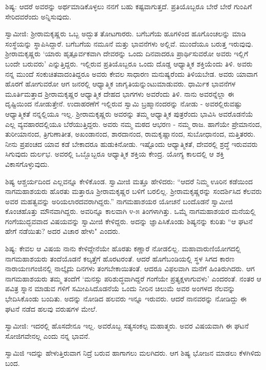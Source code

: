 ಶಿಷ್ಯ: ಆದರೆ ಅವರನ್ನು ಅರ್ಥಮಾಡಿಕೊಳ್ಳಲು ನನಗೆ ಬಹು ಕಷ್ಟವಾಗುತ್ತದೆ. ಪ್ರತಿಯೊಬ್ಬರೂ ಬೇರೆ ಬೇರೆ ಗುಂಪಿಗೆ ಸೇರಿದವರೆಂದು ಅನ್ನಿಸುವುದು.

ಸ್ವಾಮೀಜಿ: ಶ‍್ರೀರಾಮಕೃಷ್ಣರು ಒಬ್ಬ ಅದ್ಭುತ ತೋಟಗಾರರು. ಬಗೆಬಗೆಯ ಹೂಗಳಿಂದ ಹೂಗೊಂಚಲನ್ನು ಮಾಡಿ ಸಂಸ್ಥೆಯನ್ನು ಸ್ಥಾಪಿಸಿದ್ದಾರೆ. ಬಗೆಬಗೆಯ ನಮೂನೆ ಮತ್ತು ಭಾವನೆಗಳು ಅಲ್ಲಿವೆ. ಮುಂದೆಯೂ ಬರುತ್ತ ಇರುವುವು. ಶ‍್ರೀರಾಮಕೃಷ್ಣರು ‘ಯಾರು ಹೃತ್ಪೂರ್ವಕವಾಗಿ ದೇವರನ್ನು ಒಂದು ದಿನವಾದರೂ ಪ್ರಾರ್ಥಿಸುವರೋ ಅವರು ಇಲ್ಲಿಗೆ ಬಂದೇ ಬರುವರು’ ಎನ್ನುತ್ತಿದ್ದರು. ಇಲ್ಲಿರುವ ಪ್ರತಿಯೊಬ್ಬರೂ ಒಂದು ದೊಡ್ಡ ಆಧ್ಯಾತ್ಮಿಕ ಶಕ್ತಿಯೆಂದು ತಿಳಿ. ಅವರು ನನ್ನ ಮುಂದೆ ಸಂಕುಚಿತವಾದಂತಿದ್ದರೂ ಅವರು ಕೇವಲ ಸಾಧಾರಣ ಮನುಷ್ಯರೆಂದು ತಿಳಿಯಬೇಡ. ಅವರು ಯಾವಾಗ ಹೊರಗೆ ಹೋಗುವರೋ ಆಗ ಜನರಲ್ಲಿ ಆಧ್ಯಾತ್ಮಿಕ ಜಾಗೃತಿಯನ್ನುಂಟುಮಾಡುವರು. ಧಾರ್ಮಿಕ ಭಾವನೆಗಳ ಮೂರ್ತಿಮತ್ತಾದ ಶ‍್ರೀರಾಮಕೃಷ್ಣರ ಆಧ್ಯಾತ್ಮಿಕ ದೇಹದ ಭಾಗಗಳು ಅವರೆಂದು ತಿಳಿ. ನಾನು ಅವರನ್ನೆಲ್ಲಾ ಈ ದೃಷ್ಟಿಯಿಂದ ನೋಡುತ್ತೇನೆ. ಉದಾಹರಣೆಗೆ ಇಲ್ಲಿರುವ ಸ್ವಾಮಿ ಬ್ರಹ್ಮಾನಂದರನ್ನು ನೋಡು - ಅವರಲ್ಲಿರುವಷ್ಟು ಆಧ್ಯಾತ್ಮಿಕತೆ ನನ್ನಲ್ಲಿಯೂ ಇಲ್ಲ. ಶ‍್ರೀರಾಮಕೃಷ್ಣರು ಅವರನ್ನು ತಮ್ಮ ಆಧ್ಯಾತ್ಮಿಕ ಪುತ್ರರೆಂದು ಭಾವಿಸಿ ಅವರೊಡನೆಯೆ ಎಲ್ಲ ವ್ಯವಹಾರದಲ್ಲಿಯೂ ಬೆರೆಯುತ್ತಿದ್ದರು. ಅವರು ನಮ್ಮ ಮಠದ ಆಭರಣ - ನಮ್ಮ ರಾಜ. ಹಾಗೆಯೇ ಪ್ರೇಮಾನಂದ, ತುರೀಯಾನಂದ, ತ್ರಿಗುಣಾತೀತ, ಅಖಂಡಾನಂದ, ಶಾರದಾನಂದ, ರಾಮಕೃಷ್ಣಾನಂದ, ಸುಬೋಧಾನಂದ, ಮತ್ತಿತರರು. ನೀನು ಪ್ರಪಂಚದ ಯಾವ ಕಡೆ ಬೇಕಾದರೂ ಹುಡುಕಿನೋಡು. ಇಷ್ಟೊಂದು ಆಧ್ಯಾತ್ಮಿಕತೆ, ದೇವರಲ್ಲಿ ಶ್ರದ್ಧೆ ಇರುವವರು ಸಿಗುವುದು ದುರ್ಲಭ. ಅವರಲ್ಲಿ ಒಬ್ಬೊಬ್ಬರೂ ಆಧ್ಯಾತ್ಮಿಕ ಶಕ್ತಿಯ ಕೇಂದ್ರ. ಯೋಗ್ಯ ಕಾಲದಲ್ಲಿ ಆ ಶಕ್ತಿ ವಿಕಾಸಗೊಳ್ಳುವುದು.

ಶಿಷ್ಯ ಆಶ್ಚರ್ಯದಿಂದ ಎಲ್ಲವನ್ನೂ ಕೇಳಿಕೊಂಡ. ಸ್ವಾಮೀಜಿ ಮತ್ತೂ ಹೇಳಿದರು: “ಆದರೆ ನಿಮ್ಮ ಊರಿನ ಕಡೆಯಿಂದ ನಾಗಮಹಾಶಯರು ಹೊರತು ಮತ್ತಾರೂ ಶ‍್ರೀರಾಮಕೃಷ್ಣರ ಬಳಿಗೆ ಬರಲಿಲ್ಲ. ಶ‍್ರೀರಾಮಕೃಷ್ಣರನ್ನು ಸಂದರ್ಶಿಸಿದ ಕೆಲವರು ಅವರ ಮಹತ್ವವನ್ನು ಅರಿಯಲಾರದವರಾಗಿದ್ದರು.” ನಾಗಮಹಾಶಯರ ಯೋಚನೆ ಬಂದೊಡನೆ ಸ್ವಾಮೀಜಿ ಕೊಂಚಹೊತ್ತು ಮೌನವಾಗಿದ್ದರು. ಅವರಿನ್ನೂ ಕಾಲವಾಗಿ ೪-೫ ತಿಂಗಳಾಗಿತ್ತು. ಒಮ್ಮೆ ನಾಗಮಹಾಶಯರ ಮನೆಯಲ್ಲಿ ಗಂಗೆಯುದ್ಭವವಾದ ವಿಷಯವನ್ನು ಸ್ವಾಮೀಜಿ ಕೇಳಿದ್ದರು. ಅದನ್ನು ಜ್ಞಾಪಿಸಿಕೊಂಡು ಶಿಷ್ಯನನ್ನು ಕುರಿತು “ಆ ಘಟನೆ ಹೇಗೆ ನಡೆಯಿತು? ಅದರ ವಿಚಾರ ಹೇಳು" ಎಂದರು.

ಶಿಷ್ಯ: ಕೇವಲ ಆ ವಿಷಯ ನಾನು ಕೇಳಿದ್ದೇನೆಯೇ ಹೊರತು ಕಣ್ಣಾರೆ ನೋಡಲಿಲ್ಲ. ಮಹಾವಾರುಣಿಯೋಗದಲ್ಲಿ ನಾಗಮಹಾಶಯರು ತಂದೆಯೊಡನೆ ಕಲ್ಕತ್ತೆಗೆ ಹೊರಟರಂತೆ. ಆದರೆ ಹೊಗೆಬಂಡಿಯಲ್ಲಿ ಸ್ಥಳ ಸಿಗದ ಕಾರಣ ನಾರಾಯಣಗಂಜಿನಲ್ಲಿ ನಾಲ್ಕೈದು ದಿನಗಳು ತಂಗಬೇಕಾಯಿತಂತೆ. ಆದರೂ ವಿಫಲವಾಗಿ ಮನೆಗೆ ಹಿಂತಿರುಗಿದರು. ಆಗ ನಾಗಮಹಾಶಯರು ತಮ್ಮ ತಂದೆಗೆ ‘ಮನಸ್ಸು ಪರಿಶುದ್ಧವಾಗಿದ್ದರೆ ಗಂಗೆಯೇ ಪ್ರತ್ಯಕ್ಷಳಾಗುವಳು’ ಎಂದರಂತೆ. ನಂತರ ಆ ಪವಿತ್ರ ಸ್ನಾನ ಮಾಡುವ ಗಳಿಗೆ ಸಮೀಪಿಸಿದೊಡನೆಯೆ ಒಂದು ನೀರಿನ ಚಿಲುಮೆ ಅವರ ಅಂಗಳದ ನೆಲವನ್ನು ಭೇದಿಸಿಕೊಂಡು ಬಂದಿತು. ಅದನ್ನು ನೋಡಿದ ಹಲವರು ಇನ್ನೂ ಇರುವರು. ಆದರೆ ನಾನವರನ್ನು ನೋಡಿದ್ದು ಈ ಘಟನೆ ನಡೆದ ಹಲವು ವರುಷಗಳ ಮೇಲೆ.

ಸ್ವಾಮೀಜಿ: ಇದರಲ್ಲಿ ಹೊಸದೇನೂ ಇಲ್ಲ. ಅವರೊಬ್ಬ ಸತ್ಯಸಂಕಲ್ಪ ಮಹಾತ್ಮರು. ಅವರ ವಿಷಯವಾಗಿ ಈ ಘಟನೆ ಸೋಜಿಗವೇನಲ್ಲ ಎಂದು ನನ್ನ ಭಾವನೆ.

ಸ್ವಾಮಿಜಿ ಇದನ್ನು ಹೇಳುತ್ತಿರುವಾಗ ನಿದ್ರೆ ಬರುವ ಹಾಗಾಗಲು ಮಲಗಿದರು. ಆಗ ಶಿಷ್ಯ ಭೋಜನ ಮಾಡಲು ಕೆಳಗಿಳಿದು ಬಂದ.

